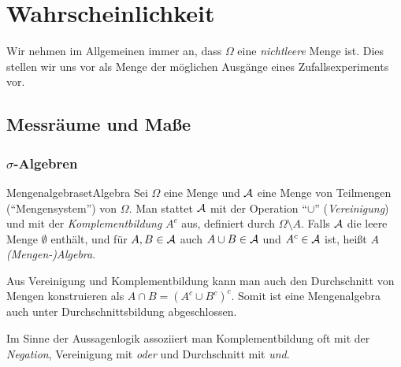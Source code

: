 \documentclass[language=ngerman]{../../Template/TemplateLecture}
\begin{document}
\setcounter{chapter}{1}



\chapter{Wahrscheinlichkeit}


Wir nehmen im Allgemeinen immer an, dass $\Omega$ eine \emph{nichtleere} Menge ist. Dies stellen wir uns vor als Menge der möglichen Ausgänge eines Zufallsexperiments vor.

\section{Messräume und Maße}

\subsection{$\sigma$-Algebren}

\begin{defi}{Mengenalgebra}{setAlgebra}
    Sei $\Omega$ eine Menge und $\mathcal{A}$ eine Menge von Teilmengen (\enquote{Mengensystem}) von $\Omega$. Man stattet $\mathcal{A}$ mit der Operation \enquote{$\cup$} (\emph{Vereinigung}) und mit der \emph{Komplementbildung} $A^c$ aus, definiert durch $\Omega \setminus A$. 
    Falls $\mathcal{A}$ die leere Menge $\emptyset$ enthält, und für $A, B \in \mathcal{A}$ auch $A \cup B \in \mathcal{A}$ und $A^c \in \mathcal{A}$ ist, heißt $A$ \emph{(Mengen-)Algebra}. 
\end{defi}

Aus Vereinigung und Komplementbildung kann man auch den Durchschnitt von Mengen konstruieren als $A \cap B = (A^c \cup B^c)^c$. Somit ist eine Mengenalgebra auch unter Durchschnittsbildung abgeschlossen.

\begin{bemerkung}
    Im Sinne der Aussagenlogik assoziiert man Komplementbildung oft mit der \emph{Negation}, Vereinigung mit \emph{oder} und Durchschnitt mit \emph{und}.
\end{bemerkung}
\end{document}
